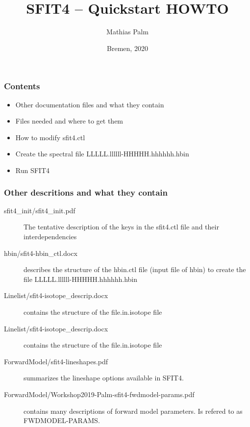 \documentclass[notes=hide]{beamer}
\title {SFIT4 -- Quickstart HOWTO}
\author[Mathias Palm]{Mathias Palm}
\date{Bremen, 2020}
\begin{document}
\begin{frame}
\maketitle
\end{frame}



\begin{frame}
  \frametitle{Contents}
  \begin{itemize}
  \item Other documentation files and what they contain
  \item Files needed and where to get them
  \item How to modify sfit4.ctl
  \item Create the spectral file LLLLL.llllll-HHHHH.hhhhhh.hbin
  \item Run SFIT4
  \end{itemize}
\end{frame}

\begin{frame}
  \frametitle{Other descritions and what they contain}
  \begin{description}
  \item[sfit4\_init/sfit4\_init.pdf] The tentative description of the
    keys in the sfit4.ctl file and their interdependencies
  \item[hbin/sfit4-hbin\_ctl.docx] describes the structure of the
    hbin.ctl file (input file of hbin) to create the file
    LLLLL.llllll-HHHHH.hhhhhh.hbin
  \item[Linelist/sfit4-isotope\_descrip.docx] contains the structure of
    the file.in.isotope file 
  \item[Linelist/sfit4-isotope\_descrip.docx] contains the structure of
    the file.in.isotope file 
  \item[ForwardModel/sfit4-lineshapes.pdf] summarizes the lineshape options available in SFIT4.
  \item[ForwardModel/Workshop2019-Palm-sfit4-fwdmodel-params.pdf] contains many
    descriptions of forward model parameters. Is refered to as FWDMODEL-PARAMS.
  \end{description}
\end{frame}
\end{document}
